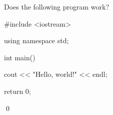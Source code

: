 Does the following program work?

\begin{console}

#include <iostream>

using namespace std;



int main()

{

    cout << "Hello, world!" << endl;



    return 0;

}

\end{console}

\qed


